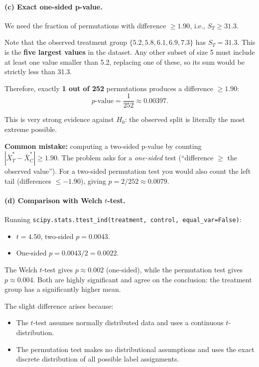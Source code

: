 \documentclass[11pt]{article}
\begin{document}
\paragraph{(c) Exact one-sided p-value.}

We need the fraction of permutations with difference $\geq 1.90$, i.e., $S_T \geq 31.3$.

Note that the observed treatment group $\{5.2, 5.8, 6.1, 6.9, 7.3\}$ has $S_T = 31.3$. This is the \textbf{five largest values} in the dataset. Any other subset of size 5 must include at least one value smaller than 5.2, replacing one of these, so its sum would be strictly less than 31.3.

Therefore, exactly \textbf{1 out of 252} permutations produces a difference $\geq 1.90$:
\[
  \boxed{p\text{-value} = \frac{1}{252} \approx 0.00397}.
\]

This is very strong evidence against $H_0$: the observed split is literally the most extreme possible.

\textbf{Common mistake:} computing a two-sided p-value by counting $|\bar{X}_T^* - \bar{X}_C^*| \geq 1.90$. The problem asks for a \textit{one-sided} test (``difference $\geq$ the observed value''). For a two-sided permutation test you would also count the left tail (differences $\leq -1.90$), giving $p = 2/252 \approx 0.0079$.

\paragraph{(d) Comparison with Welch $t$-test.}

Running \texttt{scipy.stats.ttest\_ind(treatment, control, equal\_var=False)}:

\begin{itemize}
  \item $t = 4.50$, two-sided $p = 0.0043$.
  \item One-sided $p = 0.0043 / 2 = 0.0022$.
\end{itemize}

The Welch $t$-test gives $p \approx 0.002$ (one-sided), while the permutation test gives $p \approx 0.004$. Both are highly significant and agree on the conclusion: the treatment group has a significantly higher mean.

The slight difference arises because:
\begin{itemize}
  \item The $t$-test assumes normally distributed data and uses a continuous $t$-distribution.
  \item The permutation test makes no distributional assumptions and uses the exact discrete distribution of all possible label assignments.
\end{itemize}
\end{document}
